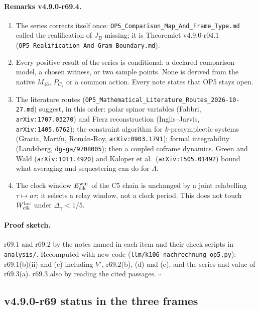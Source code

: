 \paragraph{Remarks v4.9.0-r69.4.}
\begin{enumerate}[leftmargin=2em]
\item The series corrects itself once: \texttt{OP5\_Comparison\_Map\_And\_Frame\_Type.md} called the realification of \(J_B\) missing; it is
Theoremlet v4.9.0-r04.1 (\texttt{OP5\_Realification\_And\_Gram\_Boundary.md}).
\item Every positive result of the series is conditional: a declared comparison model, a chosen witness, or two sample points.  None is derived from
the native \(M_{16}\), \(P_{C_7}\) or a common action.  Every note states that OP5 stays open.
\item The literature routes (\texttt{OP5\_Mathematical\_Literature\_Routes\_2026-10-27.md}) suggest, in this order: polar spinor variables
(Fabbri, \texttt{arXiv:1707.03270}) and Fierz reconstruction (Inglis--Jarvis, \texttt{arXiv:1405.6762}); the constraint algorithm for
\(k\)-presymplectic systems (Gracia, Mart\'in, Rom\'an-Roy, \texttt{arXiv:0903.1791}); formal integrability (Landsberg, \texttt{dg-ga/9708005}); then a
coupled coframe dynamics.  Green and Wald (\texttt{arXiv:1011.4920}) and Kaloper et al.\ (\texttt{arXiv:1505.01492}) bound what averaging and sequestering
can do for \(\Lambda\).
\item The clock window \(E_{\rm clk}^{\rm win}\) of the C5 chain is unchanged by a joint relabelling \(\tau\mapsto a\tau\); it selects a relay window, not a
clock period.  This does not touch \(W_{\rm clk}^{\rm loc}\) under \(\Delta_\gamma<1/5\).
\end{enumerate}

\paragraph{Proof sketch.}
r69.1 and r69.2 by the notes named in each item and their check scripts in \texttt{analysis/}.  Recomputed with new code
(\texttt{llm/k106\_nachrechnung\_op5.py}): r69.1(b)(ii) and (c) including \(V'\), r69.2(b), (d) and (e), and the series and value of r69.3(a).  r69.3 also by reading the
cited passages.
\(\square\)

\subsection*{v4.9.0-r69 status in the three frames}
\label{subsec:v490-r69-frames}

